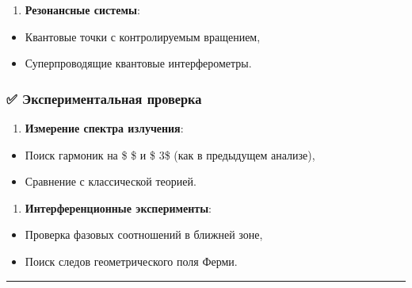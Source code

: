\documentclass[11pt]{article}
\providecommand{\tightlist}{%
      \setlength{\itemsep}{0pt}\setlength{\parskip}{0pt}}
\begin{document}
\begin{enumerate}
\def\labelenumi{\arabic{enumi}.}
\setcounter{enumi}{1}
\tightlist
\item
  \textbf{Резонансные системы}:\\
\end{enumerate}

\begin{itemize}
\tightlist
\item
  Квантовые точки с контролируемым вращением,\\
\item
  Суперпроводящие квантовые интерферометры.
\end{itemize}

\subsubsection{✅ Экспериментальная
проверка}\label{ux44dux43aux441ux43fux435ux440ux438ux43cux435ux43dux442ux430ux43bux44cux43dux430ux44f-ux43fux440ux43eux432ux435ux440ux43aux430}

\begin{enumerate}
\def\labelenumi{\arabic{enumi}.}
\tightlist
\item
  \textbf{Измерение спектра излучения}:\\
\end{enumerate}

\begin{itemize}
\tightlist
\item
  Поиск гармоник на \$ \omega \$ и \$ 3\omega \$ (как в предыдущем
  анализе),\\
\item
  Сравнение с классической теорией.
\end{itemize}

\begin{enumerate}
\def\labelenumi{\arabic{enumi}.}
\setcounter{enumi}{1}
\tightlist
\item
  \textbf{Интерференционные эксперименты}:\\
\end{enumerate}

\begin{itemize}
\tightlist
\item
  Проверка фазовых соотношений в ближней зоне,\\
\item
  Поиск следов геометрического поля Ферми.
\end{itemize}

\begin{center}\rule{0.5\linewidth}{\linethickness}\end{center}
\end{document}
